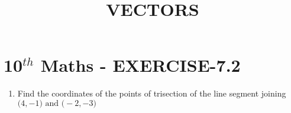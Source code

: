 \documentclass[12pt]{article}
\let\vec\mathbf
\begin{document}
\begin{center}
\title{\textbf{VECTORS}}
\date{\vspace{-5ex}} %
\maketitle
\end{center}

\section{10$^{th}$ Maths - EXERCISE-7.2}

\begin{enumerate}
\item Find the coordinates of the points of trisection of the line segment joining $\vec(4 ,-1) \text{ and } \vec(-2,-3)$ 
\end{enumerate}
\end{document}
